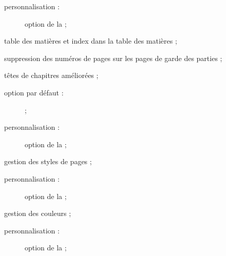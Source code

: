 \begin{description}
\begin{description}
  \item[personnalisation :] option  de la \yatCl{} ;
  \end{description}
\item[\package*+{tocbibind} :] table des matières et index dans la table des
  matières ;
\item[\package*+{nonumonpart} :] suppression des numéros de pages sur les pages
  de garde des parties ;
\item[\package{fncychap} :] %
  têtes de chapitres améliorées ;
  \begin{description}
  \item[option par défaut :]  ;
  \item[personnalisation :] option  de la \yatCl{} ;
  \end{description}
\item[\package{titlesec} :] %
  gestion des styles de pages ;
  \begin{description}
  \item[personnalisation :] option  de la \yatCl{} ;
  \end{description}
\item[\package{xcolor} :] %
  gestion des couleurs ;
  \begin{description}
  \item[personnalisation :] option  de la \yatCl{} ;

\end{description}
\end{description}

